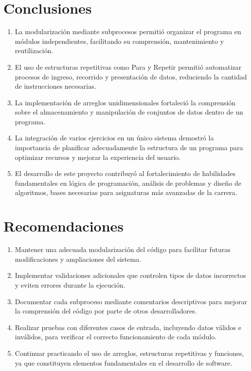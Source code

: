 \documentclass[12pt,a4paper]{article}
\begin{document}
	\section{\textcolor{azulUNEMI}{Conclusiones}}
	
	\begin{enumerate}
		\item La modularización mediante subprocesos permitió organizar el programa en módulos independientes, facilitando su comprensión, mantenimiento y reutilización.
		\item El uso de estructuras repetitivas como Para y Repetir permitió automatizar procesos de ingreso, recorrido y presentación de datos, reduciendo la cantidad de instrucciones necesarias.
		\item La implementación de arreglos unidimensionales fortaleció la comprensión sobre el almacenamiento y manipulación de conjuntos de datos dentro de un programa.
		\item La integración de varios ejercicios en un único sistema demostró la importancia de planificar adecuadamente la estructura de un programa para optimizar recursos y mejorar la experiencia del usuario.
		\item El desarrollo de este proyecto contribuyó al fortalecimiento de habilidades fundamentales en lógica de programación, análisis de problemas y diseño de algoritmos, bases necesarias para asignaturas más avanzadas de la carrera.
	\end{enumerate}
	
	\section{\textcolor{azulUNEMI}{Recomendaciones}}
	
	
	\begin{enumerate}
		\item Mantener una adecuada modularización del código para facilitar futuras modificaciones y ampliaciones del sistema.
		\item Implementar validaciones adicionales que controlen tipos de datos incorrectos y eviten errores durante la ejecución.
		\item Documentar cada subproceso mediante comentarios descriptivos para mejorar la comprensión del código por parte de otros desarrolladores.
		\item Realizar pruebas con diferentes casos de entrada, incluyendo datos válidos e inválidos, para verificar el correcto funcionamiento de cada módulo.
		\item Continuar practicando el uso de arreglos, estructuras repetitivas y funciones, ya que constituyen elementos fundamentales en el desarrollo de software.
	\end{enumerate}
	
\end{document}
